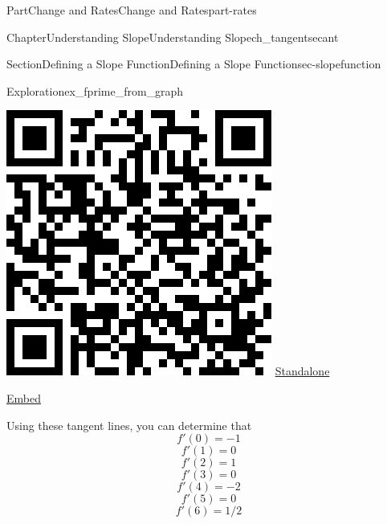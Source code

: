 \documentclass{tufte-book}
\numberwithin{equation}{chapter}
\begin{document}
\begin{partptx}{Part}{Change and Rates}{}{Change and Rates}{}{}{part-rates}
\begin{chapterptx}{Chapter}{Understanding Slope}{}{Understanding Slope}{}{}{ch_tangentsecant}
\begin{sectionptx}{Section}{Defining a Slope Function}{}{Defining a Slope Function}{}{}{sec-slopefunction}
\begin{exploration}{Exploration}{}{ex_fprime_from_graph}
\begin{enumerate}[font=\bfseries,label=(\alph*),ref=\alph*]
\begin{sidebyside}{2}{0.075}{0.075}{0.17}
\begin{sbspanel}{0.21}
\includegraphics[width=\linewidth]{generated/qrcode/ex_fprime_from_graph-2-2-2-1.png}
\href{http://webwork.bridgew.edu/oer/functions_at_work/ex_fprime_from_graph-2-2-2-1.html}{Standalone}%
\par
\href{http://webwork.bridgew.edu/oer/functions_at_work/ex_fprime_from_graph-2-2-2-1-if.html}{Embed}%
\end{sbspanel}%
\end{sidebyside}%
%
\par
Using these tangent lines, you can determine that%
\begin{equation*}
f'(0) = -1
\end{equation*}
%
\begin{equation*}
f'(1) = 0
\end{equation*}
%
\begin{equation*}
f'(2) = 1
\end{equation*}
%
\begin{equation*}
f'(3) = 0
\end{equation*}
%
\begin{equation*}
f'(4) = -2
\end{equation*}
%
\begin{equation*}
f'(5) = 0
\end{equation*}
%
\begin{equation*}
f'(6) = 1/2
\end{equation*}

\end{enumerate}
\end{exploration}
\end{sectionptx}
\end{chapterptx}
\end{partptx}
\end{document}
